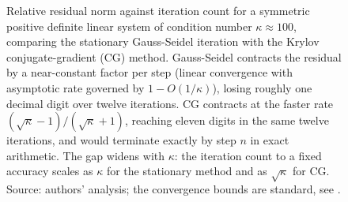 \begin{figure}[ht]
\centering
{}
\caption[Gauss-Seidel versus conjugate gradients on an SPD system]{Relative
residual norm against iteration count for a symmetric positive definite
linear system of condition number $\kappa \approx 100$, comparing the
stationary Gauss-Seidel iteration with the Krylov conjugate-gradient (CG)
method. Gauss-Seidel contracts the residual by a near-constant factor per
step (linear convergence with asymptotic rate governed by $1 - O(1/\kappa)$),
losing roughly one decimal digit over twelve iterations. CG contracts at
the faster rate $(\sqrt{\kappa}-1)/(\sqrt{\kappa}+1)$, reaching eleven
digits in the same twelve iterations, and would terminate exactly by step
$n$ in exact arithmetic. The gap widens with $\kappa$: the iteration count
to a fixed accuracy scales as $\kappa$ for the stationary method and as
$\sqrt{\kappa}$ for CG. Source: authors' analysis; the convergence bounds
are standard, see \cite[ch.~38]{text:trefethen-bau1997}.}
\label{fig:vol02:ch16:cg-vs-gs}
\end{figure}
